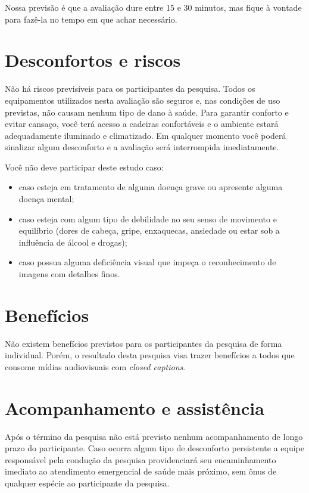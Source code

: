 \documentclass[a4paper,11pt,titlepage,singlespacing]{article}
\begin{document}
Nossa previsão é que a avaliação dure entre 15 e 30 minutos, mas fique à vontade para fazê-la no tempo em que achar necessário.



\section*{Desconfortos e riscos}

\noindent Não há riscos previsíveis para os participantes da pesquisa. Todos os equipamentos utilizados nesta avaliação são seguros e, nas condições de uso previstas, não causam nenhum tipo de dano à saúde. Para garantir conforto e evitar cansaço, você terá acesso a cadeiras confortáveis e o ambiente estará adequadamente iluminado e climatizado. Em qualquer momento você poderá sinalizar algum desconforto e a avaliação será interrompida imediatamente.

Você não deve participar deste estudo caso:

\begin{itemize}
\item caso esteja em tratamento de alguma doença grave ou apresente alguma doença mental;
\item caso esteja com algum tipo de debilidade no seu senso de movimento e equilíbrio (dores de cabeça, gripe, enxaquecas, ansiedade ou estar sob a influência de álcool e drogas);
\item caso possua alguma deficiência visual que impeça o reconhecimento de imagens com detalhes finos.
\end{itemize}

\section*{Benefícios}

\noindent Não existem benefícios previstos para os participantes da pesquisa de forma individual. Porém, o resultado desta pesquisa visa trazer benefícios a todos que consome mídias audiovisuais com \textit{closed captions}.

\section*{Acompanhamento e assistência}

\noindent Após o término da pesquisa não está previsto nenhum acompanhamento de longo prazo do participante. Caso ocorra algum tipo de desconforto persistente a equipe responsável pela condução da pesquisa providenciará seu encaminhamento imediato ao atendimento emergencial de saúde mais próximo, sem ônus de qualquer espécie ao participante da pesquisa.
\end{document}
